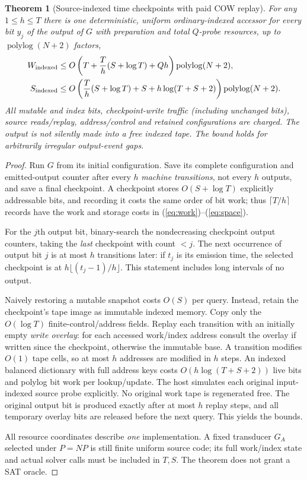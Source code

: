 \documentclass[11pt]{article}
\newtheorem{theorem}{Theorem}
\begin{document}
\begin{theorem}[Source-indexed time checkpoints with paid COW replay]
For any $1\le h\le T$ there is one deterministic, uniform ordinary-indexed
accessor for every bit $y_j$ of the output of $G$ with preparation and total
$Q$-probe resources, up to $\operatorname{polylog}(N+2)$ factors,
\begin{align}
W_{\rm indexed}
 &\le O\left(T+\frac{T}{h}(S+\log T)+Qh\right)
       \operatorname{polylog}(N+2), \label{eq:work}\\
S_{\rm indexed}
 &\le O\left(\frac{T}{h}(S+\log T)+S+h\log(T+S+2)\right)
       \operatorname{polylog}(N+2). \label{eq:space}
\end{align}
All mutable and index bits, checkpoint-write traffic (including unchanged
bits), source reads/replay, address/control and retained configurations
are charged. The output is not silently made into a free indexed tape.
The bound holds for arbitrarily irregular output-event gaps.
\end{theorem}
\begin{proof}
Run $G$ from its initial configuration. Save its complete configuration
and emitted-output counter after every $h$ \emph{machine transitions},
not every $h$ outputs, and save a final checkpoint. A checkpoint stores
$O(S+\log T)$ explicitly addressable bits, and recording it costs the
same order of bit work; thus $\lceil T/h\rceil$ records have the work
and storage costs in (\ref{eq:work})--(\ref{eq:space}).

For the $j$th output bit, binary-search the nondecreasing checkpoint
output counters, taking the \emph{last} checkpoint with count $<j$.
The next occurrence of output bit $j$ is at most $h$ transitions later:
if $t_j$ is its emission time, the selected checkpoint is at
$h\lfloor(t_j-1)/h\rfloor$. This statement includes long intervals
of no output.

Naively restoring a mutable snapshot costs $O(S)$ per query.
Instead, retain the checkpoint's tape image as immutable indexed memory.
Copy only the $O(\log T)$ finite-control/address fields. Replay each
transition with an initially empty \emph{write overlay}: for each accessed
work/index address consult the overlay if written since the checkpoint,
otherwise the immutable base. A transition modifies $O(1)$ tape cells,
so at most $h$ addresses are modified in $h$ steps. An indexed balanced
dictionary with full address keys costs
$O(h\log(T+S+2))$ live bits and polylog bit work per lookup/update.
The host simulates each original input-indexed source probe explicitly.
No original work tape is regenerated free. The original output bit
is produced exactly after at most $h$ replay steps, and all temporary
overlay bits are released before the next query. This yields the bounds.

All resource coordinates describe \emph{one} implementation.
A fixed transducer $G_A$ selected under $P=NP$ is still finite uniform
source code; its full work/index state and actual solver calls must be
included in $T,S$. The theorem does not grant a SAT oracle.
\end{proof}
\end{document}
